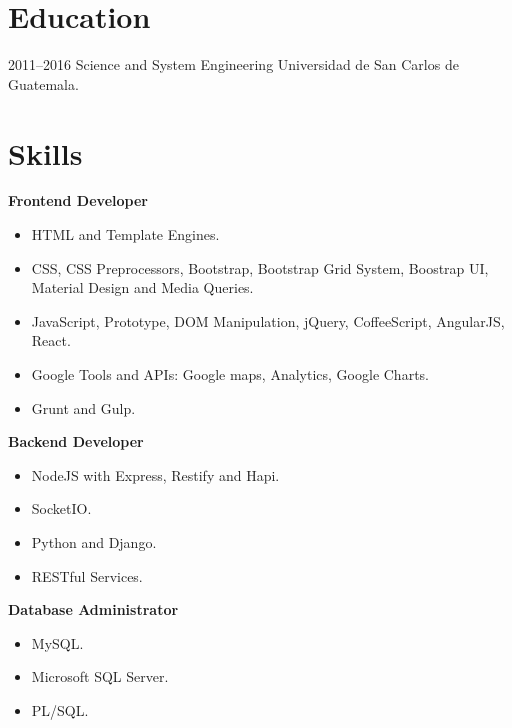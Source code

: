 \documentclass[]{friggeri-cv} %
\begin{document}

\section{Education}

\begin{entrylist}
\entry
{2011--2016}
{Science and System Engineering}
{Universidad de San Carlos de Guatemala.}
{}
\end{entrylist}

\section{Skills}

\textbf{Frontend Developer}

\begin{itemize}
	\item HTML and Template Engines.
	\item CSS, CSS Preprocessors, Bootstrap, Bootstrap Grid System, Boostrap UI, Material Design and Media Queries.
	\item JavaScript, Prototype, DOM Manipulation, jQuery, CoffeeScript, AngularJS, React.
	\item Google Tools and APIs: Google maps, Analytics, Google Charts.
	\item Grunt and Gulp.
\end{itemize}

\textbf{Backend Developer}
\begin{itemize}
	\item NodeJS with Express, Restify and Hapi.
	\item SocketIO.
	\item Python and Django.
	\item RESTful Services.
\end{itemize}

\textbf{Database Administrator}
\begin{itemize}
	\item MySQL.
	\item Microsoft SQL Server.
	\item PL/SQL.
\end{itemize}
\end{document}
